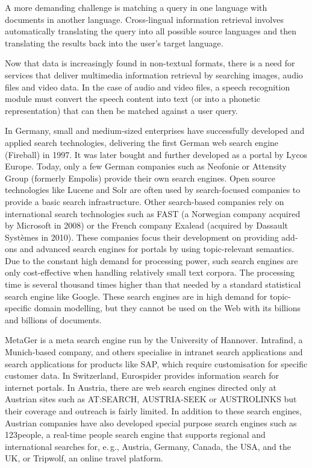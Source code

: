 \documentclass[]{../../metanetpaper}
\begin{document}
\begin{multicols}{2}
A more demanding challenge is matching a query in one language with documents in another language. Cross-lingual information retrieval involves automatically translating the query into all possible source languages and then translating the results back into the user's target language.

Now that data is increasingly found in non-textual formats, there is a need for services that deliver multimedia information retrieval by searching images, audio files and video data. In the case of audio and video files, a speech recognition module must convert the speech content into text (or into a phonetic representation) that can then be matched against a user query.

In Germany, small and medium-sized enterprises have successfully developed and applied search technologies, delivering the first German web search engine (Fireball) in 1997. It was later bought and further developed as a portal by Lycos Europe. Today, only a few German companies such as Neofonie or Attensity Group (formerly Empolis) provide their own search engines. Open source technologies like Lucene and Solr are often used by search-focused companies to provide a basic search infrastructure. Other search-based companies rely on international search technologies such as FAST (a Norwegian company acquired by Microsoft in 2008) or the French company Exalead (acquired by Dassault Systèmes in 2010). These companies focus their development on providing add-ons and advanced search engines for portals by using topic-relevant semantics. Due to the constant high demand for processing power, such search engines are only cost-effective when handling relatively small text corpora. The processing time is several thousand times higher than that needed by a standard statistical search engine like Google. These search engines are in high demand for topic-specific domain modelling, but they cannot be used on the Web with its billions and billions of documents.

MetaGer is a meta search engine run by the University of Hannover. Intrafind, a Munich-based company, and others specialise in intranet search applications and search applications for products like SAP, which require customisation for specific customer data. In Switzerland, Eurospider provides information search for internet portals. In Austria, there are web search engines directed only at Austrian sites such as AT:SEARCH, AUSTRIA-SEEK or AUSTROLINKS but their coverage and outreach is fairly limited. In addition to these search engines, Austrian companies have also developed special purpose search engines such as 123people, a real-time people search engine that supports regional and international searches for, e.\,g., Austria, Germany, Canada, the USA, and the UK, or Tripwolf, an online travel platform.


\end{multicols}
\end{document}
